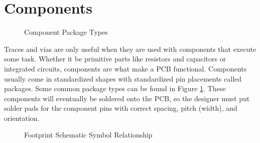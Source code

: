 \section{Components}
\begin{figure}[H]
  \centering
\caption{Component Package Types}
\label{img:componentpackage}
\end{figure}
Traces and vias are only useful when they are used with components that execute some task. Whether it be primitive parts like resistors and capacitors
or integrated circuits, components are what make a PCB functional. Components usually come in standardized shapes with standardized pin placements
called packages. Some common package types can be found in Figure \ref{img:componentpackage}. These components will eventually be soldered
onto the PCB, so the designer must put solder pads for the component pins with correct spacing, pitch (width), and orientation. 

\begin{figure}[H]
  \centering
\caption{Footprint Schematic Symbol Relationship}
\label{img:footprint}
\end{figure}

